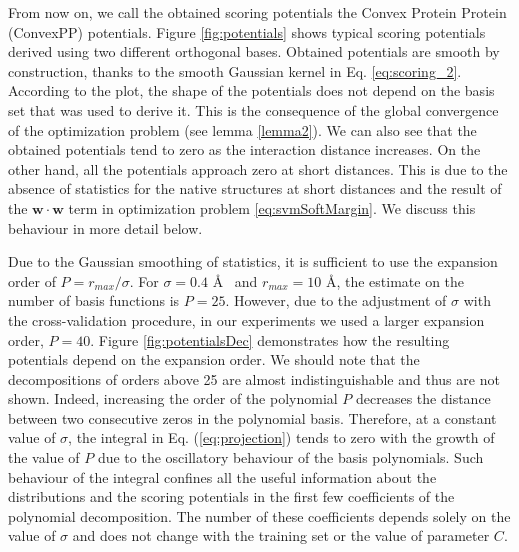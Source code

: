From now on, we call the obtained scoring potentials the Convex Protein Protein (ConvexPP) potentials. 
Figure \ref{fig:potentials} shows typical scoring potentials derived using two different orthogonal bases. 
%
Obtained potentials are smooth by construction, thanks to the smooth Gaussian kernel in Eq. \ref{eq:scoring_2}.
%
According to the plot, the shape of the potentials does not depend on the basis set that was
used to derive it. This is the consequence of the global convergence of the optimization problem (see lemma \ref{lemma2}).
We can also see that the obtained potentials tend to zero as the interaction distance increases. On the other hand, all the potentials approach zero at short distances. 
This is due to the absence of statistics for the native structures at short distances and the result of the $ \mathbf{w}\cdot\mathbf{w}$ term in optimization problem \ref{eq:svmSoftMargin}. 
We discuss this behaviour in more detail below.

%
Due to the Gaussian smoothing of statistics, 
it is sufficient to use the expansion order of $P = r_{max}/{\sigma}$. 
For $\sigma=0.4$ \AA~ and $ r_{max}=10$ \AA , the estimate on the number of basis functions is $P=25$. 
However, due to the adjustment of $\sigma$ with the cross-validation procedure, in our experiments we used a larger expansion order,  $P=40$.
Figure \ref{fig:potentialsDec} demonstrates how the resulting potentials depend on the expansion order. We should note that the decompositions of orders above 25 are almost indistinguishable and thus are not shown. 
Indeed,
increasing the order of the polynomial $P$ decreases the distance between two consecutive zeros in the polynomial basis. Therefore, at a constant value of $\sigma$, the integral in Eq. (\ref{eq:projection})
tends to zero with the growth of the value of $P$ due to the oscillatory behaviour of the basis polynomials. Such behaviour of the integral confines all the useful  information 
about the distributions and the scoring potentials in the first few coefficients of the polynomial decomposition. The number of these coefficients depends solely on the value of $\sigma$ 
and does not change with the training set
or the value of  parameter $C$.

